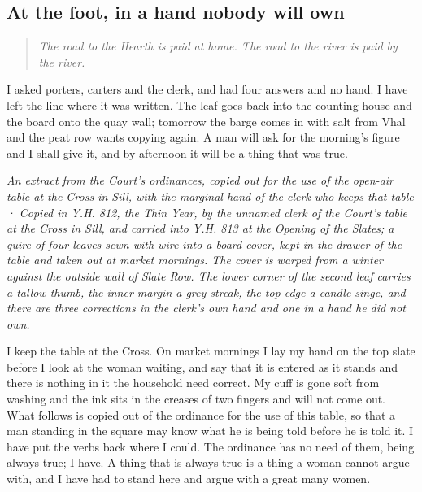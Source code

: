 \documentclass{design/chronicle}
\begin{document}
\subsection*{At the foot, in a hand nobody will own}

\begin{quote}\itshape The road to the Hearth is paid at home. The road to the river is paid by the river.\end{quote}

I asked porters, carters and the clerk, and had four answers and no hand. I have left the line where it was written. The leaf goes back into the counting house and the board onto the quay wall; tomorrow the barge comes in with salt from Vhal and the peat row wants copying again. A man will ask for the morning’s figure and I shall give it, and by afternoon it will be a thing that was true.

\clearpage{}
{\centering\FellFont\itshape\footnotesize\color{faded} An extract from the Court’s ordinances, copied out for the use of the open-air table at the Cross in Sill, with the marginal hand of the clerk who keeps that table · Copied in Y.H. 812, the Thin Year, by the unnamed clerk of the Court’s table at the Cross in Sill, and carried into Y.H. 813 at the Opening of the Slates; a quire of four leaves sewn with wire into a board cover, kept in the drawer of the table and taken out at market mornings. The cover is warped from a winter against the outside wall of Slate Row. The lower corner of the second leaf carries a tallow thumb, the inner margin a grey streak, the top edge a candle-singe, and there are three corrections in the clerk’s own hand and one in a hand he did not own.\par}\medskip
I keep the table at the Cross. On market mornings I lay my hand on the top slate before I look at the woman waiting, and say that it is entered as it stands and there is nothing in it the household need correct. My cuff is gone soft from washing and the ink sits in the creases of two fingers and will not come out. What follows is copied out of the ordinance for the use of this table, so that a man standing in the square may know what he is being told before he is told it. I have put the verbs back where I could. The ordinance has no need of them, being always true; I have. A thing that is always true is a thing a woman cannot argue with, and I have had to stand here and argue with a great many women.
\end{document}
